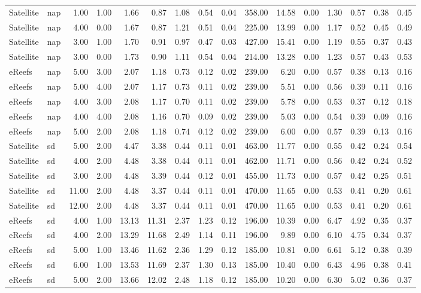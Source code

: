 \begin{table}[ht]
\begin{tabular}{llrrrrrrrrrrrrrr}
  Satellite & nap & 1.00 & 1.00 & 1.66 & 0.87 & 1.08 & 0.54 & 0.04 & 358.00 & 14.58 & 0.00 & 1.30 & 0.57 & 0.38 & 0.45 \\ 
  Satellite & nap & 4.00 & 0.00 & 1.67 & 0.87 & 1.21 & 0.51 & 0.04 & 225.00 & 13.99 & 0.00 & 1.17 & 0.52 & 0.45 & 0.49 \\ 
  Satellite & nap & 3.00 & 1.00 & 1.70 & 0.91 & 0.97 & 0.47 & 0.03 & 427.00 & 15.41 & 0.00 & 1.19 & 0.55 & 0.37 & 0.43 \\ 
  Satellite & nap & 3.00 & 0.00 & 1.73 & 0.90 & 1.11 & 0.54 & 0.04 & 214.00 & 13.28 & 0.00 & 1.23 & 0.57 & 0.43 & 0.53 \\ 
  eReefs & nap & 5.00 & 3.00 & 2.07 & 1.18 & 0.73 & 0.12 & 0.02 & 239.00 & 6.20 & 0.00 & 0.57 & 0.38 & 0.13 & 0.16 \\ 
  eReefs & nap & 5.00 & 4.00 & 2.07 & 1.17 & 0.73 & 0.11 & 0.02 & 239.00 & 5.51 & 0.00 & 0.56 & 0.39 & 0.11 & 0.16 \\ 
  eReefs & nap & 4.00 & 3.00 & 2.08 & 1.17 & 0.70 & 0.11 & 0.02 & 239.00 & 5.78 & 0.00 & 0.53 & 0.37 & 0.12 & 0.18 \\ 
  eReefs & nap & 4.00 & 4.00 & 2.08 & 1.16 & 0.70 & 0.09 & 0.02 & 239.00 & 5.03 & 0.00 & 0.54 & 0.39 & 0.09 & 0.16 \\ 
  eReefs & nap & 5.00 & 2.00 & 2.08 & 1.18 & 0.74 & 0.12 & 0.02 & 239.00 & 6.00 & 0.00 & 0.57 & 0.39 & 0.13 & 0.16 \\ 
   \midrule
Satellite & sd & 5.00 & 2.00 & 4.47 & 3.38 & 0.44 & 0.11 & 0.01 & 463.00 & 11.77 & 0.00 & 0.55 & 0.42 & 0.24 & 0.54 \\ 
  Satellite & sd & 4.00 & 2.00 & 4.48 & 3.38 & 0.44 & 0.11 & 0.01 & 462.00 & 11.71 & 0.00 & 0.56 & 0.42 & 0.24 & 0.52 \\ 
  Satellite & sd & 3.00 & 2.00 & 4.48 & 3.39 & 0.44 & 0.12 & 0.01 & 455.00 & 11.73 & 0.00 & 0.57 & 0.42 & 0.25 & 0.51 \\ 
  Satellite & sd & 11.00 & 2.00 & 4.48 & 3.37 & 0.44 & 0.11 & 0.01 & 470.00 & 11.65 & 0.00 & 0.53 & 0.41 & 0.20 & 0.61 \\ 
  Satellite & sd & 12.00 & 2.00 & 4.48 & 3.37 & 0.44 & 0.11 & 0.01 & 470.00 & 11.65 & 0.00 & 0.53 & 0.41 & 0.20 & 0.61 \\ 
  eReefs & sd & 4.00 & 1.00 & 13.13 & 11.31 & 2.37 & 1.23 & 0.12 & 196.00 & 10.39 & 0.00 & 6.47 & 4.92 & 0.35 & 0.37 \\ 
  eReefs & sd & 4.00 & 2.00 & 13.29 & 11.68 & 2.49 & 1.14 & 0.11 & 196.00 & 9.89 & 0.00 & 6.10 & 4.75 & 0.34 & 0.37 \\ 
  eReefs & sd & 5.00 & 1.00 & 13.46 & 11.62 & 2.36 & 1.29 & 0.12 & 185.00 & 10.81 & 0.00 & 6.61 & 5.12 & 0.38 & 0.39 \\ 
  eReefs & sd & 6.00 & 1.00 & 13.53 & 11.69 & 2.37 & 1.30 & 0.13 & 185.00 & 10.40 & 0.00 & 6.43 & 4.96 & 0.38 & 0.41 \\ 
  eReefs & sd & 5.00 & 2.00 & 13.66 & 12.02 & 2.48 & 1.18 & 0.12 & 185.00 & 10.20 & 0.00 & 6.30 & 5.02 & 0.36 & 0.37 \\ 
   \bottomrule
\end{tabular}
\endgroup
\end{table}
